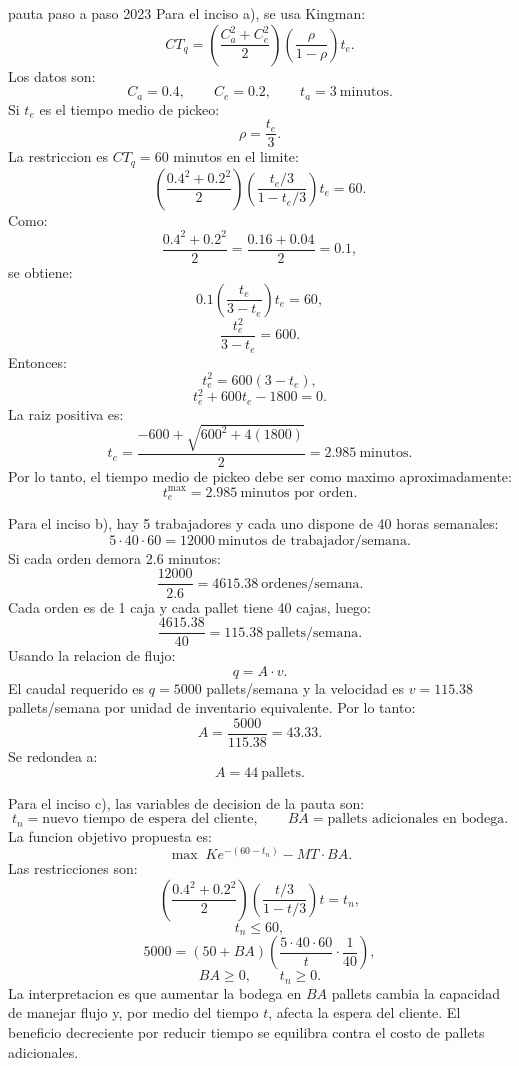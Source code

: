 \begin{pautacompleta}{pauta paso a paso 2023}
Para el inciso a), se usa Kingman:
\[
  CT_q=
  \left(\frac{C_a^2+C_e^2}{2}\right)
  \left(\frac{\rho}{1-\rho}\right)t_e.
\]
Los datos son:
\[
  C_a=0.4,\qquad C_e=0.2,\qquad t_a=3\ \text{minutos}.
\]
Si $t_e$ es el tiempo medio de pickeo:
\[
  \rho=\frac{t_e}{3}.
\]
La restriccion es $CT_q=60$ minutos en el limite:
\[
  \left(\frac{0.4^2+0.2^2}{2}\right)
  \left(\frac{t_e/3}{1-t_e/3}\right)t_e=60.
\]
Como:
\[
  \frac{0.4^2+0.2^2}{2}=\frac{0.16+0.04}{2}=0.1,
\]
se obtiene:
\[
  0.1\left(\frac{t_e}{3-t_e}\right)t_e=60,
\]
\[
  \frac{t_e^2}{3-t_e}=600.
\]
Entonces:
\[
  t_e^2=600(3-t_e),
\]
\[
  t_e^2+600t_e-1800=0.
\]
La raiz positiva es:
\[
  t_e=\frac{-600+\sqrt{600^2+4(1800)}}{2}=2.985\ \text{minutos}.
\]
Por lo tanto, el tiempo medio de pickeo debe ser como maximo aproximadamente:
\[
  t_e^{\max}=2.985\ \text{minutos por orden}.
\]

Para el inciso b), hay 5 trabajadores y cada uno dispone de 40 horas semanales:
\[
  5\cdot 40\cdot 60=12000\ \text{minutos de trabajador/semana}.
\]
Si cada orden demora 2.6 minutos:
\[
  \frac{12000}{2.6}=4615.38\ \text{ordenes/semana}.
\]
Cada orden es de 1 caja y cada pallet tiene 40 cajas, luego:
\[
  \frac{4615.38}{40}=115.38\ \text{pallets/semana}.
\]
Usando la relacion de flujo:
\[
  q=A\cdot v.
\]
El caudal requerido es $q=5000$ pallets/semana y la velocidad es $v=115.38$ pallets/semana por unidad de inventario equivalente. Por lo tanto:
\[
  A=\frac{5000}{115.38}=43.33.
\]
Se redondea a:
\[
  A=44\ \text{pallets}.
\]

Para el inciso c), las variables de decision de la pauta son:
\[
  t_n=\text{nuevo tiempo de espera del cliente},
  \qquad
  BA=\text{pallets adicionales en bodega}.
\]
La funcion objetivo propuesta es:
\[
  \max\; K e^{-(60-t_n)}-MT\cdot BA.
\]
Las restricciones son:
\[
  \left(\frac{0.4^2+0.2^2}{2}\right)
  \left(\frac{t/3}{1-t/3}\right)t=t_n,
\]
\[
  t_n\leq 60,
\]
\[
  5000=(50+BA)\left(\frac{5\cdot 40\cdot 60}{t}\cdot \frac{1}{40}\right),
\]
\[
  BA\geq 0,\qquad t_n\geq 0.
\]
La interpretacion es que aumentar la bodega en $BA$ pallets cambia la capacidad de manejar flujo y, por medio del tiempo $t$, afecta la espera del cliente. El beneficio decreciente por reducir tiempo se equilibra contra el costo de pallets adicionales.
\end{pautacompleta}

